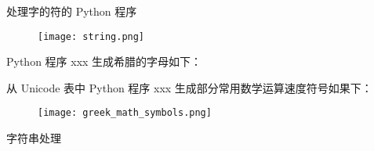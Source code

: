 \documentclass[main.tex]{subfiles}
\begin{document}
处理字的符的 Python 程序

\begin{figure}
	\texttt{[image: string.png]}
\end{figure}

Python 程序 xxx 生成希腊的字母如下：


从 Unicode 表中 Python 程序 xxx 生成部分常用数学运算速度符号如果下：


\begin{figure}
	\texttt{[image: greek\_math\_symbols.png]}
\end{figure}



字符串处理

\newpage
\end{document}
